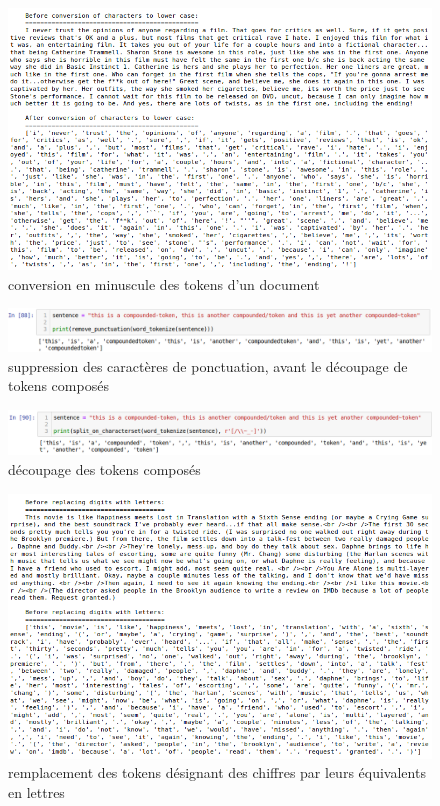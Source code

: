 \documentclass[12pt,a4paper]{report}
\theoremstyle{definition}
\begin{document}
\begin{appendices}
\begin{figure}[!ht]
  \centering
  \includegraphics[scale=0.6]{images/snapshots/lowercase.png}
  \caption{conversion en minuscule des tokens d'un document}
  \label{fig:lowercase}
\end{figure}

\begin{figure}[!ht]
  \centering
  \includegraphics[scale=0.45]{images/snapshots/before_split_characterset.png}
  \caption{suppression des caractères de ponctuation, avant le découpage de tokens composés}
  \label{fig:before_split_characterset}
\end{figure}

\begin{figure}[!ht]
  \centering
  \includegraphics[scale=0.45]{images/snapshots/after_split_characterset.png}
  \caption{découpage des tokens composés}
  \label{fig:after_split_characterset}
\end{figure}

\begin{figure}[!ht]
  \centering
  \includegraphics[scale=0.5]{images/snapshots/replace_numbers.png}
  \caption{remplacement des tokens désignant des chiffres par leurs équivalents en lettres}
  \label{fig:replace_numbers}
\end{figure}


\end{appendices}
\end{document}
